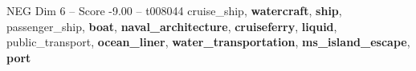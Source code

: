 \begin{textsample}{NEG Dim 6 – Score -9.00 – t008044}  \label{ex:f6_neg_015}
cruise\_ship, \textbf{watercraft}, \textbf{ship}, passenger\_ship, \textbf{boat}, \textbf{naval\_architecture}, \textbf{cruiseferry}, \textbf{liquid}, public\_transport, \textbf{ocean\_liner}, \textbf{water\_transportation}, \textbf{ms\_island\_escape}, \textbf{port}

\end{textsample}
